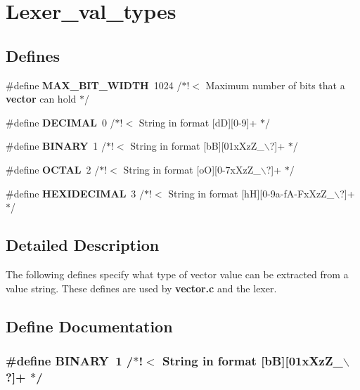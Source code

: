 \section{Lexer\_\-val\_\-types}
\label{group__lexer__val__types}
\subsection*{Defines}
\begin{CompactItemize}
\item 
\#define {\bf MAX\_\-BIT\_\-WIDTH}\ 1024    /$\ast$!$<$ Maximum number of bits that a {\bf vector} can hold $\ast$/
\item 
\#define {\bf DECIMAL}\ 0	/$\ast$!$<$ String in format [d\-D][0-9]+                   $\ast$/
\item 
\#define {\bf BINARY}\ 1	/$\ast$!$<$ String in format [b\-B][01x\-Xz\-Z\_\-$\backslash$?]+             $\ast$/
\item 
\#define {\bf OCTAL}\ 2	/$\ast$!$<$ String in format [o\-O][0-7x\-Xz\-Z\_\-$\backslash$?]+            $\ast$/
\item 
\#define {\bf HEXIDECIMAL}\ 3	/$\ast$!$<$ String in format [h\-H][0-9a-f\-A-Fx\-Xz\-Z\_\-$\backslash$?]+      $\ast$/
\end{CompactItemize}


\subsection{Detailed Description}
The following defines specify what type of vector value can be extracted from a value string. These defines are used by {\bf vector.c} and the lexer. 

\subsection{Define Documentation}
\subsubsection{\setlength{\rightskip}{0pt plus 5cm}\#define BINARY\ 1	/$\ast$!$<$ String in format [b\-B][01x\-Xz\-Z\_\-$\backslash$?]+             $\ast$/}\label{group__lexer__val__types_a2}


